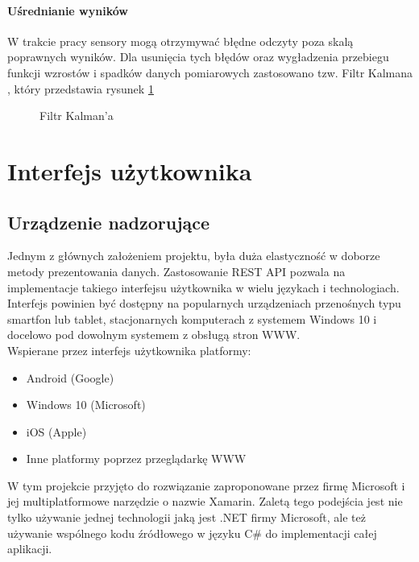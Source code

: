 \documentclass[a4paper,10pt]{article}
\begin{document}
\paragraph{Uśrednianie wyników} W trakcie pracy sensory mogą otrzymywać błędne odczyty poza skalą poprawnych wyników. Dla usunięcia tych błędów oraz wygładzenia przebiegu funkcji wzrostów i spadków danych pomiarowych zastosowano tzw. Filtr Kalmana \cite{KalmanWiki}, który przedstawia rysunek \ref{diagram_kalman}

\begin{figure}[H]
\label{diagram_kalman}
\centering
\begin{minipage}{1\textwidth}
\centering

\end{minipage}
\caption{Filtr Kalman'a}
\end{figure}

\section{Interfejs użytkownika}

\subsection{Urządzenie nadzorujące}
\label{interfejs_uzytkownika}
Jednym z głównych założeniem projektu, była duża elastyczność w doborze metody prezentowania danych.
Zastosowanie REST API\cite{RestApiWiki} pozwala na implementacje takiego interfejsu użytkownika w wielu językach i technologiach. 
Interfejs powinien być dostępny na popularnych urządzeniach przenośnych typu smartfon lub tablet, stacjonarnych komputerach z systemem Windows 10 i docelowo pod dowolnym systemem z obsługą stron WWW.\\

Wspierane przez interfejs użytkownika platformy:
\begin{itemize}
    \item Android (Google) \cite{GoogleWiki}
    \item Windows 10 (Microsoft) \cite{Windows10Wiki}
	\item iOS (Apple) \cite{IOSWiki}
	\item Inne platformy poprzez przeglądarkę WWW
\end{itemize}

W tym projekcie przyjęto do rozwiązanie zaproponowane przez firmę Microsoft\cite{MicrosoftWiki} i jej multiplatformowe narzędzie o nazwie Xamarin\cite{XamarinWiki}. Zaletą tego podejścia jest nie tylko używanie jednej technologii jaką jest .NET\cite{DotNetWiki} firmy Microsoft, ale też używanie wspólnego kodu źródłowego w języku C\# \cite{CSharpWiki} do implementacji całej aplikacji.
\end{document}
